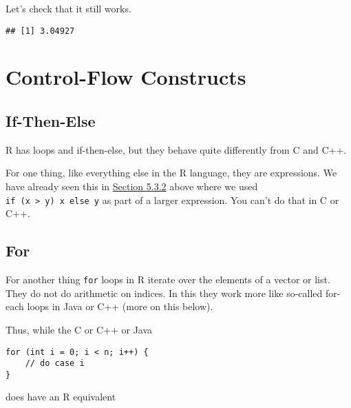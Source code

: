 \documentclass[
]{article}
\newenvironment{Shaded}{\begin{snugshade}}{\end{snugshade}}
\newcommand{\AttributeTok}[1]{\textcolor[rgb]{0.77,0.63,0.00}{#1}}
\newcommand{\ConstantTok}[1]{\textcolor[rgb]{0.00,0.00,0.00}{#1}}
\newcommand{\FunctionTok}[1]{\textcolor[rgb]{0.00,0.00,0.00}{#1}}
\newcommand{\NormalTok}[1]{#1}
\newcommand{\OtherTok}[1]{\textcolor[rgb]{0.56,0.35,0.01}{#1}}
\newcommand{\SpecialCharTok}[1]{\textcolor[rgb]{0.00,0.00,0.00}{#1}}
\begin{document}
Let's check that it still works.

\begin{Shaded}
\end{Shaded}

\begin{verbatim}
## [1] 3.04927
\end{verbatim}

\hypertarget{control-flow-constructs}{%
\section{Control-Flow Constructs}\label{control-flow-constructs}}

\hypertarget{if-then-else}{%
\subsection{If-Then-Else}\label{if-then-else}}

R has loops and if-then-else, but they behave quite differently from C
and C++.

For one thing, like everything else in the R language, they are
expressions. We have already seen this in
\protect\hyperlink{reduce}{Section 5.3.2} above where we used
\texttt{if\ (x\ \textgreater{}\ y)\ x\ else\ y} as part of a larger
expression. You can't do that in C or C++.

\hypertarget{for}{%
\subsection{For}\label{for}}

For another thing \texttt{for} loops in R iterate over the elements of a
vector or list. They do not do arithmetic on indices. In this they work
more like so-called for-each loops in Java or C++ (more on this below).

Thus, while the C or C++ or Java

\begin{verbatim}
for (int i = 0; i < n; i++) {
    // do case i
}
\end{verbatim}

does have an R equivalent
\end{document}
